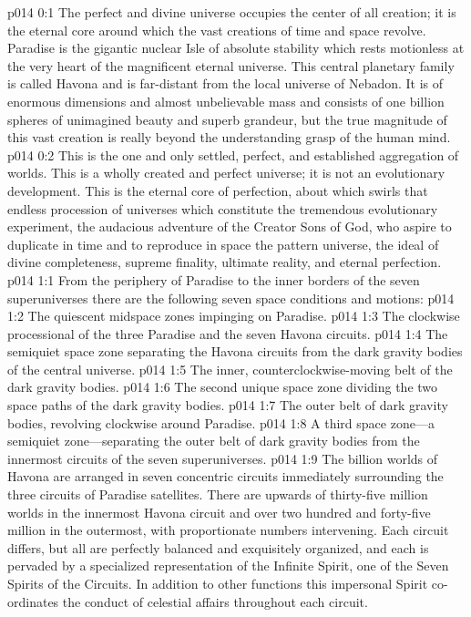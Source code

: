 \author{Perfector of Wisdom}
\vs p014 0:1 The perfect and divine universe occupies the center of all creation; it is the eternal core around which the vast creations of time and space revolve. Paradise is the gigantic nuclear Isle of absolute stability which rests motionless at the very heart of the magnificent eternal universe. This central planetary family is called Havona and is far\hyp{}distant from the local universe of Nebadon. It is of enormous dimensions and almost unbelievable mass and consists of one billion spheres of unimagined beauty and superb grandeur, but the true magnitude of this vast creation is really beyond the understanding grasp of the human mind.
\vs p014 0:2 This is the one and only settled, perfect, and established aggregation of worlds. This is a wholly created and perfect universe; it is not an evolutionary development. This is the eternal core of perfection, about which swirls that endless procession of universes which constitute the tremendous evolutionary experiment, the audacious adventure of the Creator Sons of God, who aspire to duplicate in time and to reproduce in space the pattern universe, the ideal of divine completeness, supreme finality, ultimate reality, and eternal perfection.
\vs p014 1:1 From the periphery of Paradise to the inner borders of the seven superuniverses there are the following seven space conditions and motions:
\pc \vs p014 1:2 \bibnobreakspace The quiescent midspace zones impinging on Paradise.
\vs p014 1:3 \bibnobreakspace The clockwise processional of the three Paradise and the seven Havona circuits.\plusone
\vs p014 1:4 \bibnobreakspace The semiquiet space zone separating the Havona circuits from the dark gravity bodies of the central universe.
\vs p014 1:5 \bibnobreakspace The inner, counterclockwise\hyp{}moving belt of the dark gravity bodies.
\vs p014 1:6 \bibnobreakspace The second unique space zone dividing the two space paths of the dark gravity bodies.
\vs p014 1:7 \bibnobreakspace The outer belt of dark gravity bodies, revolving clockwise around Paradise.
\vs p014 1:8 \bibnobreakspace A third space zone---a semiquiet zone---separating the outer belt of dark gravity bodies from the innermost circuits of the seven superuniverses.
\pc \vs p014 1:9 The billion worlds of Havona are arranged in seven concentric circuits immediately surrounding the three circuits of Paradise satellites. There are upwards of thirty\hyp{}five million worlds in the innermost Havona circuit and over two hundred and forty\hyp{}five million in the outermost, with proportionate numbers intervening. Each circuit differs, but all are perfectly balanced and exquisitely organized, and each is pervaded by a specialized representation of the Infinite Spirit, one of the Seven Spirits of the Circuits. In addition to other functions this impersonal Spirit co\hyp{}ordinates the conduct of celestial affairs throughout each circuit.
